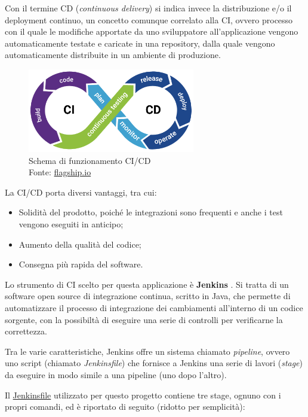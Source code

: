 Con il termine CD (\textit{continuous delivery}) si indica invece la distribuzione e/o il deployment continuo, un concetto comunque correlato alla CI, ovvero processo con il quale le modifiche apportate da uno sviluppatore all'applicazione vengono automaticamente testate e caricate in una repository, dalla quale vengono automaticamente distribuite in un ambiente di produzione. \cite{cicd}

\begin{figure}[H]
\centering
\includegraphics[width=0.65\textwidth,height=\textheight,keepaspectratio]{img/ci}
\caption{Schema di funzionamento CI/CD\\Fonte: \url{flagship.io}}
\label{fig:cicd}
\end{figure}

La CI/CD porta diversi vantaggi, tra cui:
\begin{itemize}
  \item Solidità del prodotto, poiché le integrazioni sono frequenti e anche i test vengono eseguiti in anticipo;
  \item Aumento della qualità del codice;
  \item Consegna più rapida del software.
\end{itemize}

Lo strumento di CI scelto per questa applicazione è \textbf{Jenkins} \cite{jenkins}. Si tratta di un software open source di integrazione continua, scritto in Java, che permette di automatizzare il processo di integrazione dei cambiamenti all'interno di un codice sorgente, con la possibiltà di eseguire una serie di controlli per verificarne la correttezza.

Tra le varie caratteristiche, Jenkins offre un sistema chiamato \textit{pipeline}, ovvero uno script (chiamato \textit{Jenkinsfile}) che fornisce a Jenkins una serie di lavori (\textit{stage}) da eseguire in modo simile a una pipeline (uno dopo l'altro).

Il \url{Jenkinsfile} utilizzato per questo progetto contiene tre stage, ognuno con i propri comandi, ed è riportato di seguito (ridotto per semplicità):

